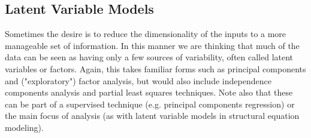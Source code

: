 \documentclass[english,nohyper,titlepage]{tufte-handout}\usepackage{knitr}
\begin{document}
\subsection{Latent Variable Models}
Sometimes the desire is to reduce the dimensionality of the inputs to a more manageable set of information.  In this manner we are thinking that much of the data can be seen as having only a few sources of variability, often called latent variables or factors.  Again, this takes familiar forms such as principal components and ("exploratory") factor analysis, but would also include independence components analysis and partial least squares techniques.  Note also that these can be part of a supervised technique (e.g. principal components regression) or the main focus of analysis (as with latent variable models in structural equation modeling).
\end{document}
